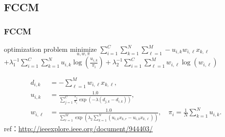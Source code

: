 \documentclass[fleqn,dvipdfmx,10pt]{beamer}
\begin{document}
\subsection{FCCM}
\begin{frame}\frametitle{FCCM}%
  \begin{block}{optimization problem}
    $\underset{u,w,\pi}{\text{minimize}}$
    $\sum_{i=1}^C\sum_{k=1}^N\sum_{\ell=1}^M-u_{i,k}w_{i,\ell}x_{k,\ell}$\\
    $+\lambda_1^{-1}\sum_{i=1}^C\sum_{k=1}^N u_{i,k}\log{(\frac{u_{i,k}}{\pi_i})}
    +\lambda_2^{-1}\sum_{i=1}^C\sum_{\ell=1}^M w_{i,\ell}\log(w_{i,\ell})$\centering\\
  \end{block}
  \begin{align}
    d_{i,k}&=-\sum_{\ell=1}^Mw_{i,\ell}x_{k,\ell},\\
    u_{i,k}&=\frac{1.0}{\sum_{j=1}^C\frac{\pi_{j}}{\pi_{i}}\exp\left(-\lambda(d_{j,k}-d_{i,k})\right)},\\
    w_{i,\ell}&=\frac{1.0}{\sum_{r=1}^M\exp\left(\lambda_2\sum_{k=1}^N(u_{i,k}x_{k,r}-u_{i,k}x_{k,\ell})\right)},\quad
    \pi_i=\frac{1}{N}\sum_{k=1}^Nu_{i,k}.
  \end{align}
  ref：\url{http://ieeexplore.ieee.org/document/944403/}\centering
\end{frame}
\end{document}
